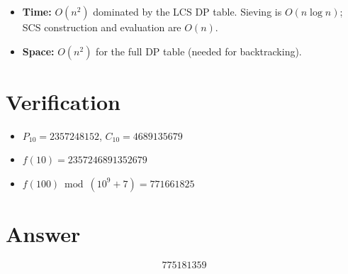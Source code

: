 \documentclass[11pt]{article}
\begin{document}
\begin{itemize}
    \item \textbf{Time:} $O(n^2)$ dominated by the LCS DP table. Sieving is $O(n \log n)$; SCS construction and evaluation are $O(n)$.
    \item \textbf{Space:} $O(n^2)$ for the full DP table (needed for backtracking).
\end{itemize}

\section{Verification}

\begin{itemize}
    \item $P_{10} = 2357248152$, $C_{10} = 4689135679$
    \item $f(10) = 2357246891352679$ \checkmark
    \item $f(100) \bmod (10^9+7) = 771661825$ \checkmark
\end{itemize}

\section{Answer}

\[
\boxed{775181359}
\]
\end{document}
